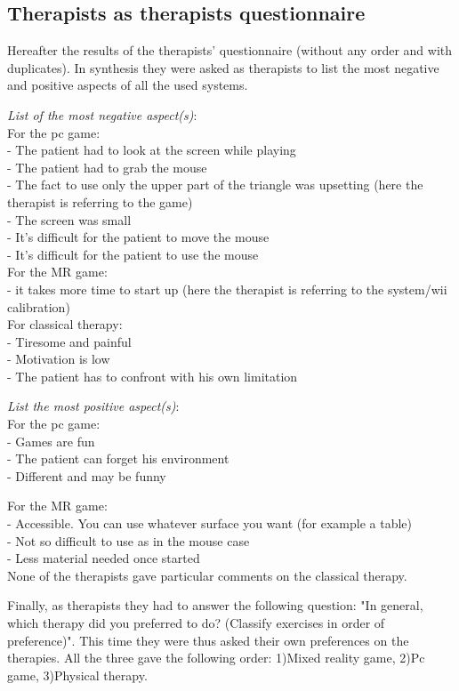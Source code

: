 \documentclass[preprint,authoryear,12pt]{elsarticle}
\begin{document}
\subsection{Therapists as therapists questionnaire}
\label{resultstherapists}
Hereafter the results of the therapists' questionnaire (without any order and with duplicates). In synthesis they were asked as therapists to list the most negative and positive aspects of all the used systems.
\par\medskip
\emph{List of the most negative aspect(s)}:\\				
For the pc game: \\
- The patient had to look at the screen while playing	
\\- The  patient had to grab the mouse			
\\ - The  fact to use only the upper part of the triangle was upsetting (here the therapist is referring to the game)			
\\ - The  screen was small			
\\- It's difficult for the patient to move the mouse 			
\\ - It's difficult for the patient to use the mouse			
\\
For the MR game: 	 \\ - it takes more time to start up  (here the therapist is referring to the system/wii calibration)	
\\
For classical therapy:
\\ - Tiresome and painful			
\\ - Motivation is low			
\\ - The patient has to confront with his own limitation			
				
\par\medskip
\emph{List the most positive aspect(s)}: 	\\	
For the pc game:\\ - Games are fun
	\\ - The patient can forget his environment
	\\ - Different and may be funny
\par\medskip
For the MR game:  \\ - Accessible. You can use whatever surface you want (for example a table)
	\\ - Not so difficult to use as in the mouse case
	\\ - Less material needed once started 
\\
None of the therapists gave particular comments on the classical therapy.
\par\medskip
Finally, as  therapists they had to answer the following question: "In general, which therapy did you preferred to do? (Classify exercises in order of preference)".			
This time they were thus asked their own preferences on  the therapies.
All the three gave the following order: 1)Mixed reality game,  2)Pc game,	3)Physical therapy.
\end{document}
